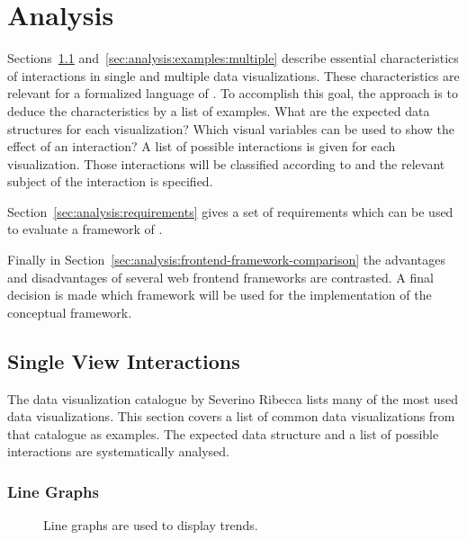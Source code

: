 \chapter{Analysis}\label{sec:analysis}
Sections~\ref{sec:analysis:examples:single} and~\ref{sec:analysis:examples:multiple} describe essential characteristics of interactions in single and multiple data visualizations.
These characteristics are relevant for a formalized language of \cmvs{}.
To accomplish this goal, the approach is to deduce the characteristics by a list of examples.
What are the expected data structures for each visualization?
Which visual variables can be used to show the effect of an interaction?
A list of possible interactions is given for each visualization.
Those interactions will be classified according to \textcite{Yi2007} and the relevant subject of the interaction is specified.

Section~\ref{sec:analysis:requirements} gives a set of requirements which can be used to evaluate a framework of \cmvs{}.

Finally in Section~\ref{sec:analysis:frontend-framework-comparison} the advantages and disadvantages of several web frontend frameworks are contrasted.
A final decision is made which framework will be used for the implementation of the conceptual framework.

\section{Single View Interactions}\label{sec:analysis:examples:single}

The data visualization catalogue by Severino Ribecca lists many of the most used data visualizations\parencite{VisualizationCatalogue2017}.
This section covers a list of common data visualizations from that catalogue as examples.
The expected data structure and a list of possible interactions are systematically analysed.

\subsection{Line Graphs}
\begin{figure}
  \caption{Line graphs are used to display trends.}
  \label{fig:analysis:line-graphs}
  \begin{center}
    \qquad
  \end{center}
\end{figure}

